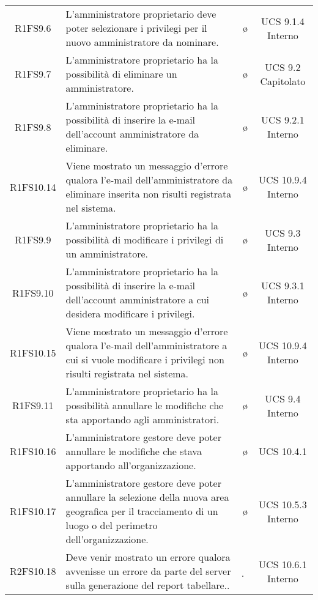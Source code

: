 {\begin{longtable}{ c C{6.5cm} c c}
R1FS9.6 & L'amministratore proprietario deve poter selezionare i privilegi per il nuovo amministratore da nominare. & \o & UCS 9.1.4 Interno\\

R1FS9.7 & L'amministratore proprietario ha la possibilità di eliminare un amministratore. & \o & UCS 9.2 Capitolato\\

R1FS9.8 & L'amministratore proprietario ha la possibilità di inserire la e-mail dell'account amministratore da eliminare. & \o & UCS 9.2.1 Interno\\

R1FS10.14 & Viene mostrato un messaggio d'errore qualora l'e-mail dell'amministratore da eliminare inserita non risulti registrata nel sistema. & \o & UCS 10.9.4 Interno\\

R1FS9.9 & L'amministratore proprietario ha la possibilità di modificare i privilegi di un amministratore. & \o & UCS 9.3 Interno\\

R1FS9.10 & L'amministratore proprietario ha la possibilità di inserire la e-mail dell'account amministratore a cui desidera modificare i privilegi. & \o & UCS 9.3.1 Interno\\

R1FS10.15 & Viene mostrato un messaggio d'errore qualora l'e-mail dell'amministratore a cui si vuole modificare i privilegi non risulti registrata nel sistema. & \o & UCS 10.9.4 Interno\\

R1FS9.11 & L'amministratore proprietario ha la possibilità annullare le modifiche che sta apportando agli amministratori. & \o & UCS 9.4 Interno\\

R1FS10.16 & L'amministratore gestore deve poter annullare le modifiche che stava apportando all'organizzazione. & \o & UCS 10.4.1\\

R1FS10.17 & L'amministratore gestore deve poter annullare la selezione della nuova area geografica per il tracciamento di un luogo o del perimetro dell'organizzazione. & \o & UCS 10.5.3 Interno\\

R2FS10.18 & Deve venir mostrato un errore qualora avvenisse un errore da parte del server sulla generazione del report tabellare.. & \d & UCS 10.6.1 Interno\\

\end{longtable}
}